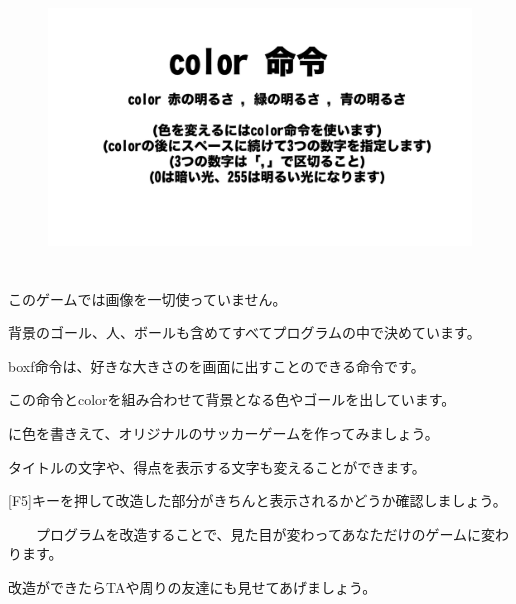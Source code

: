 \begin{figure}[H]
    \begin{center}
      \includegraphics[keepaspectratio,width=12.409cm,height=7.62cm]{text04-img/s_kicksrc3.png}
    \end{center}
    \label{fig:prog_menu}
\end{figure}


このゲームでは画像を一切使っていません。

背景のゴール、人、ボールも含めてすべてプログラムの中で決めています。

boxf命令は、好きな大きさのを画面に出すことのできる命令です。

この命令とcolorを組み合わせて背景となる色やゴールを出しています。



に色を書きえて、オリジナルのサッカーゲームを作ってみましょう。

タイトルの文字や、得点を表示する文字も変えることができます。




\begin{description}
    \item {}
\end{description}


[F5]キーを押して改造した部分がきちんと表示されるかどうか確認しましょう。

\ \ \ \ プログラムを改造することで、見た目が変わってあなただけのゲームに変わります。

改造ができたらTAや周りの友達にも見せてあげましょう。